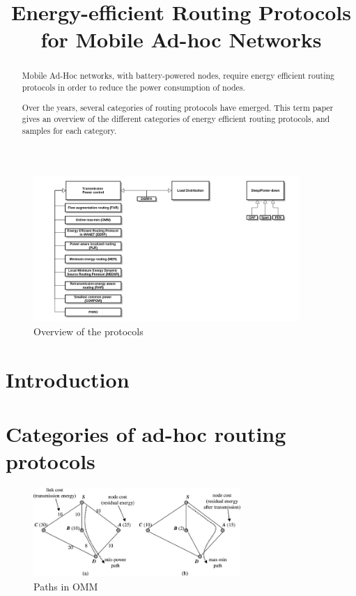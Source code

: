 \documentclass[conference]{IEEEtran}
\begin{document}
\title{Energy-efficient Routing Protocols for Mobile Ad-hoc Networks}
\author{
}

\maketitle



\begin{abstract}
Mobile Ad-Hoc networks, with battery-powered nodes, require energy efficient
routing protocols in order to reduce the power consumption of nodes.

Over the years, several categories of routing protocols have emerged.
This term paper gives an overview of the different categories of energy
efficient routing protocols, and samples for each category.
\end{abstract}
\begin{figure}
  \includegraphics[width=0.9\textwidth]{images/overview}
  \caption{Overview of the protocols}
  \label{fig:overview}
\end{figure}

\section{Introduction}


\section{Categories of ad-hoc routing protocols}

\begin{figure}
\centering
\includegraphics[width=0.7\textwidth]{images/omm}
\caption{Paths in OMM\cite{alotaibi2012survey}}
\label{ommex}
\end{figure}
\end{document}
